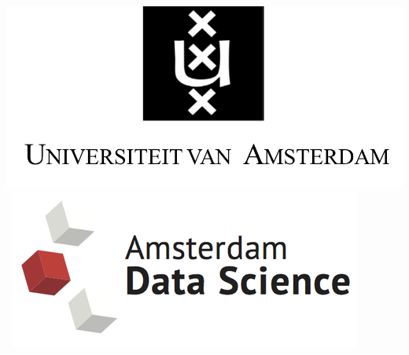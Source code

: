 \begin{titlepage}
\begin{center}
	\mbox{
		\includegraphics[width=.2\paperwidth]{images/logo-uva.png} 
		\includegraphics[width=.2\paperwidth]{images/ads.png}
	}
\end{center}

\pagebreak
\tableofcontents

\end{titlepage}

